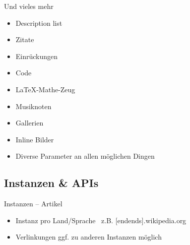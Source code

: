 \documentclass[9pt]{beamer}
\begin{document}
	\begin{frame}{Und vieles mehr}
		\begin{itemize}
			\item Description list
			\item Zitate
			\item Einrückungen
			\item Code
			\item \LaTeX-Mathe-Zeug
			\item Musiknoten
			\item Gallerien
			\item Inline Bilder
			\item Diverse Parameter an allen möglichen Dingen
		\end{itemize}
	\end{frame}
	
	\subsection{Instanzen \& APIs}
	
	\begin{frame}{Instanzen -- Artikel}
		\begin{itemize}
			\item Instanz pro Land/Sprache \textrightarrow\ z.B. [en\textbar de\textbar nds].wikipedia.org
			\item Verlinkungen ggf. zu anderen Instanzen möglich
		\end{itemize}
	\end{frame}
\end{document}
